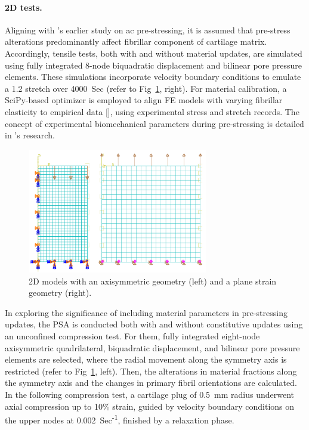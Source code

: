 \paragraph{2D tests.} Aligning with \cite{wang2018}'s earlier study on \ac{ac} pre-stressing, it is assumed that pre-stress alterations predominantly affect fibrillar component of cartilage matrix. Accordingly, tensile tests, both with and without material updates, are simulated using fully integrated 8-node biquadratic displacement and bilinear pore pressure elements. These simulations incorporate velocity boundary conditions to emulate a 1.2 stretch over 4000~Sec (refer to Fig~\ref{fig:fe_psa_2d}, right). For material calibration, a SciPy-based optimizer is employed to align FE models with varying fibrillar elasticity to empirical data [\cite{elliott2002}], using experimental stress and stretch records. The concept of experimental biomechanical parameters during pre-stressing is detailed in \cite{wang2018}'s research.
%
\begin{figure}\centering
\includegraphics[width=0.7\textwidth]{img/fe_psa_2d.jpg}
\caption{2D models with an axisymmetric geometry (left) and a plane strain geometry (right).}
\label{fig:fe_psa_2d}
\end{figure}

In exploring the significance of including material parameters in pre-stressing updates, the PSA is conducted both with and without constitutive updates using an unconfined compression test. For them, fully integrated eight-node axisymmetric quadrilateral, biquadratic displacement, and bilinear pore pressure elements are selected, where the radial movement along the symmetry axis is restricted (refer to Fig~\ref{fig:fe_psa_2d}, left). Then, the alterations in material fractions along the symmetry axis and the changes in primary fibril orientations are calculated. In the following compression test, a cartilage plug of 0.5~mm radius underwent axial compression up to 10\% strain, guided by velocity boundary conditions on the upper nodes at 0.002~Sec\textsuperscript{-1}, finished by a relaxation phase.

